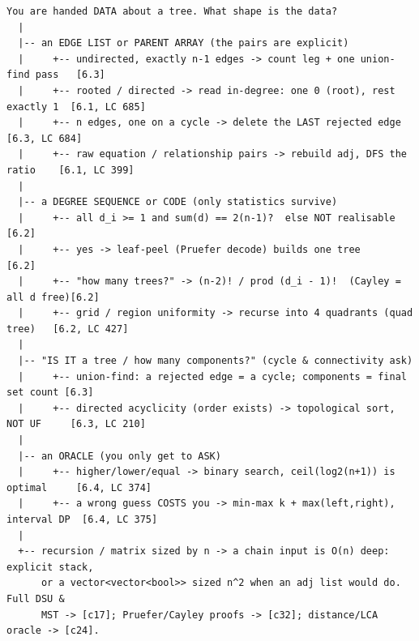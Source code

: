 \begin{lstlisting}[language={}, basicstyle=\ttfamily\small, numbers=none, frame=single]
  You are handed DATA about a tree. What shape is the data?
  |
  |-- an EDGE LIST or PARENT ARRAY (the pairs are explicit)
  |     +-- undirected, exactly n-1 edges -> count leg + one union-find pass   [6.3]
  |     +-- rooted / directed -> read in-degree: one 0 (root), rest exactly 1  [6.1, LC 685]
  |     +-- n edges, one on a cycle -> delete the LAST rejected edge           [6.3, LC 684]
  |     +-- raw equation / relationship pairs -> rebuild adj, DFS the ratio    [6.1, LC 399]
  |
  |-- a DEGREE SEQUENCE or CODE (only statistics survive)
  |     +-- all d_i >= 1 and sum(d) == 2(n-1)?  else NOT realisable           [6.2]
  |     +-- yes -> leaf-peel (Pruefer decode) builds one tree                  [6.2]
  |     +-- "how many trees?" -> (n-2)! / prod (d_i - 1)!  (Cayley = all d free)[6.2]
  |     +-- grid / region uniformity -> recurse into 4 quadrants (quad tree)   [6.2, LC 427]
  |
  |-- "IS IT a tree / how many components?" (cycle & connectivity ask)
  |     +-- union-find: a rejected edge = a cycle; components = final set count [6.3]
  |     +-- directed acyclicity (order exists) -> topological sort, NOT UF     [6.3, LC 210]
  |
  |-- an ORACLE (you only get to ASK)
  |     +-- higher/lower/equal -> binary search, ceil(log2(n+1)) is optimal     [6.4, LC 374]
  |     +-- a wrong guess COSTS you -> min-max k + max(left,right), interval DP  [6.4, LC 375]
  |
  +-- recursion / matrix sized by n -> a chain input is O(n) deep: explicit stack,
      or a vector<vector<bool>> sized n^2 when an adj list would do. Full DSU &
      MST -> [c17]; Pruefer/Cayley proofs -> [c32]; distance/LCA oracle -> [c24].
\end{lstlisting}



